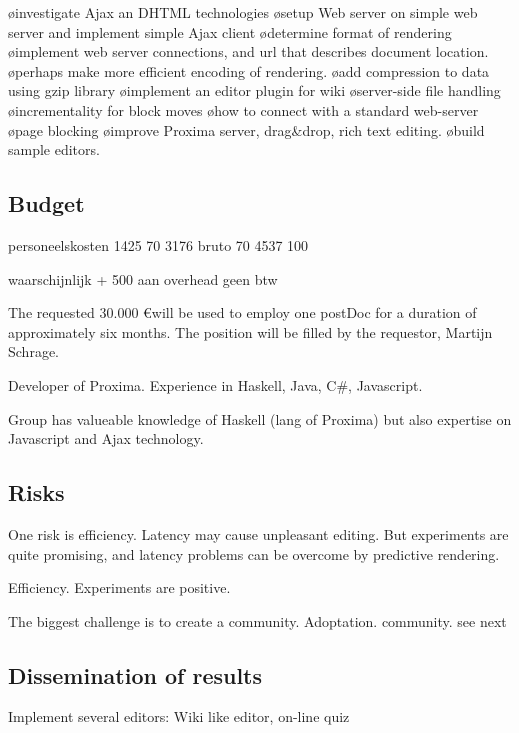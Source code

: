 \bl
\o investigate Ajax an DHTML technologies
\o setup Web server on simple web server and implement simple Ajax client
\o determine format of rendering
\o implement web server connections, and url that describes document location.
\o perhaps make more efficient encoding of rendering.
\o add compression to data using gzip library
\o implement an editor plugin for wiki
\o server-side file handling
\o incrementality for block moves
\o how to connect with a standard web-server
\o page blocking
\o improve Proxima server, drag&drop, rich text editing.
\o build sample editors.
\el

\subsection{Budget}

\bc
personeelskosten
1425       70%
3176 bruto 70%
4537       100%

waarschijnlijk + 500 aan overhead
geen btw

\ec

The requested 30.000 \euro will be used to employ one postDoc for a duration of approximately six months. The position will be filled by the requestor, Martijn Schrage.

Developer of Proxima. Experience in Haskell, Java, C#, Javascript.

Group has valueable knowledge of Haskell (lang of Proxima) but also expertise on Javascript and Ajax technology.
\subsection{Risks}

One risk is efficiency. Latency may cause unpleasant editing. But experiments are quite promising, and latency problems can be overcome by predictive rendering. 

Efficiency. Experiments are positive.

The biggest challenge is to create a community. Adoptation. community. see next


\subsection{Dissemination of results}

Implement several editors: Wiki like editor, on-line quiz

